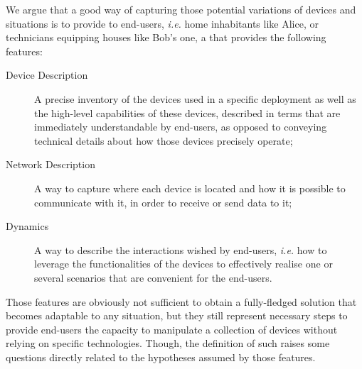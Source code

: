 We argue that a good way of capturing those potential variations of devices and situations is to provide to end-users, \textit{i.e.} home inhabitants like Alice, or technicians equipping houses like Bob's one, a \DSL that provides the following features:

\begin{description}
	\item[Device Description] A precise inventory of the devices used in a specific deployment as well as the high-level capabilities of these devices, described in terms that are immediately understandable by end-users, as opposed to conveying technical details about how those devices precisely operate;
	
	\item[Network Description] A way to capture where each device is located and how it is possible to communicate with it, in order to receive or send data to it;

	\item[Dynamics] A way to describe the interactions wished by end-users, \textit{i.e.} how to leverage the functionalities of the devices to effectively realise one or several scenarios that are convenient for the end-users.  
	
\end{description}
Those features are obviously not sufficient to obtain a fully-fledged solution that becomes adaptable to any situation, but they still represent necessary steps to provide end-users the capacity to manipulate a collection of devices without relying on specific technologies. Though, the definition of such \DSLS raises some questions directly related to the hypotheses assumed by those features.

